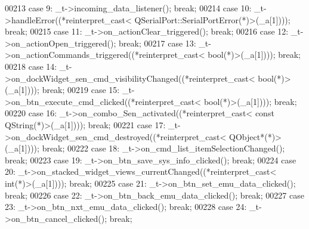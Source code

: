 \begin{DoxyCode}
00213         \textcolor{keywordflow}{case} 9: \_t->incoming\_data\_listener(); \textcolor{keywordflow}{break};
00214         \textcolor{keywordflow}{case} 10: \_t->handleError((*\textcolor{keyword}{reinterpret\_cast<} QSerialPort::SerialPortError(*)\textcolor{keyword}{>}(\_a[1]))); \textcolor{keywordflow}{break};
00215         \textcolor{keywordflow}{case} 11: \_t->on\_actionClear\_triggered(); \textcolor{keywordflow}{break};
00216         \textcolor{keywordflow}{case} 12: \_t->on\_actionOpen\_triggered(); \textcolor{keywordflow}{break};
00217         \textcolor{keywordflow}{case} 13: \_t->on\_actionCommands\_triggered((*\textcolor{keyword}{reinterpret\_cast<} \textcolor{keywordtype}{bool}(*)\textcolor{keyword}{>}(\_a[1]))); \textcolor{keywordflow}{break};
00218         \textcolor{keywordflow}{case} 14: \_t->on\_dockWidget\_sen\_cmd\_visibilityChanged((*\textcolor{keyword}{reinterpret\_cast<} \textcolor{keywordtype}{bool}(*)\textcolor{keyword}{>}(\_a[1]))); \textcolor{keywordflow}{break};
00219         \textcolor{keywordflow}{case} 15: \_t->on\_btn\_execute\_cmd\_clicked((*\textcolor{keyword}{reinterpret\_cast<} \textcolor{keywordtype}{bool}(*)\textcolor{keyword}{>}(\_a[1]))); \textcolor{keywordflow}{break};
00220         \textcolor{keywordflow}{case} 16: \_t->on\_combo\_Sen\_activated((*\textcolor{keyword}{reinterpret\_cast<} \textcolor{keyword}{const }QString(*)\textcolor{keyword}{>}(\_a[1]))); \textcolor{keywordflow}{break};
00221         \textcolor{keywordflow}{case} 17: \_t->on\_dockWidget\_sen\_cmd\_destroyed((*\textcolor{keyword}{reinterpret\_cast<} QObject*(*)\textcolor{keyword}{>}(\_a[1]))); \textcolor{keywordflow}{break};
00222         \textcolor{keywordflow}{case} 18: \_t->on\_cmd\_list\_itemSelectionChanged(); \textcolor{keywordflow}{break};
00223         \textcolor{keywordflow}{case} 19: \_t->on\_btn\_save\_sys\_info\_clicked(); \textcolor{keywordflow}{break};
00224         \textcolor{keywordflow}{case} 20: \_t->on\_stacked\_widget\_views\_currentChanged((*\textcolor{keyword}{reinterpret\_cast<} \textcolor{keywordtype}{int}(*)\textcolor{keyword}{>}(\_a[1]))); \textcolor{keywordflow}{break};
00225         \textcolor{keywordflow}{case} 21: \_t->on\_btn\_set\_emu\_data\_clicked(); \textcolor{keywordflow}{break};
00226         \textcolor{keywordflow}{case} 22: \_t->on\_btn\_back\_emu\_data\_clicked(); \textcolor{keywordflow}{break};
00227         \textcolor{keywordflow}{case} 23: \_t->on\_btn\_nxt\_emu\_data\_clicked(); \textcolor{keywordflow}{break};
00228         \textcolor{keywordflow}{case} 24: \_t->on\_btn\_cancel\_clicked(); \textcolor{keywordflow}{break};

\end{DoxyCode}
